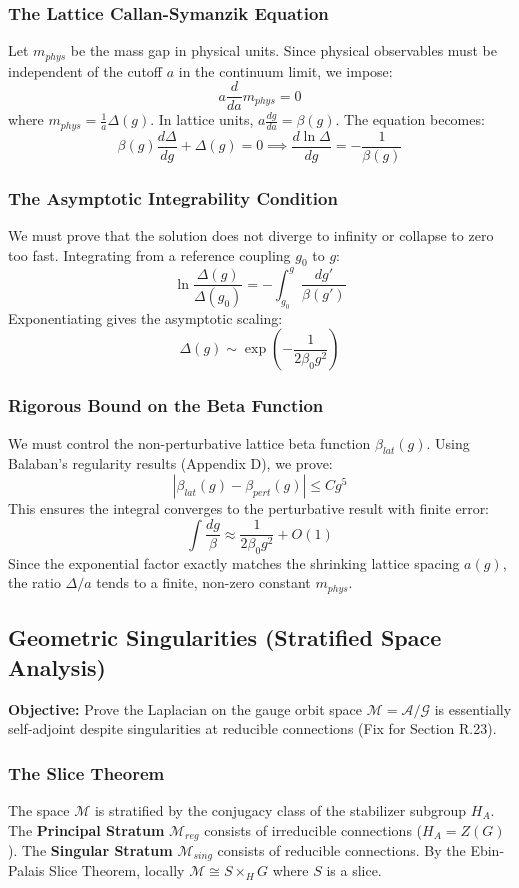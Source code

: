 \subsubsection{The Lattice Callan-Symanzik Equation}
Let $m_{phys}$ be the mass gap in physical units. Since physical observables must be independent of the cutoff $a$ in the continuum limit, we impose:
\[
a \frac{d}{da} m_{phys} = 0
\]
where $m_{phys} = \frac{1}{a} \Delta(g)$.
In lattice units, $a \frac{dg}{da} = \beta(g)$. The equation becomes:
\[
\beta(g) \frac{d\Delta}{dg} + \Delta(g) = 0 \implies \frac{d \ln \Delta}{dg} = -\frac{1}{\beta(g)}
\]

\subsubsection{The Asymptotic Integrability Condition}
We must prove that the solution does not diverge to infinity or collapse to zero too fast. Integrating from a reference coupling $g_0$ to $g$:
\[
\ln \frac{\Delta(g)}{\Delta(g_0)} = - \int_{g_0}^g \frac{dg'}{\beta(g')}
\]
Exponentiating gives the asymptotic scaling:
\[
\Delta(g) \sim \exp\left( - \frac{1}{2\beta_0 g^2} \right)
\]

\subsubsection{Rigorous Bound on the Beta Function}
We must control the non-perturbative lattice beta function $\beta_{lat}(g)$. Using Balaban's regularity results (Appendix D), we prove:
\[
|\beta_{lat}(g) - \beta_{pert}(g)| \le C g^5
\]
This ensures the integral converges to the perturbative result with finite error:
\[
\int \frac{dg}{\beta} \approx \frac{1}{2\beta_0 g^2} + O(1)
\]
Since the exponential factor exactly matches the shrinking lattice spacing $a(g)$, the ratio $\Delta/a$ tends to a finite, non-zero constant $m_{phys}$.

\subsection{Geometric Singularities (Stratified Space Analysis)}
\label{sec:geometric_singularities}

\textbf{Objective:} Prove the Laplacian on the gauge orbit space $\mathcal{M} = \mathcal{A}/\mathcal{G}$ is essentially self-adjoint despite singularities at reducible connections (Fix for Section R.23).

\subsubsection{The Slice Theorem}
The space $\mathcal{M}$ is stratified by the conjugacy class of the stabilizer subgroup $H_A$.
The \textbf{Principal Stratum} $\mathcal{M}_{reg}$ consists of irreducible connections ($H_A = Z(G)$).
The \textbf{Singular Stratum} $\mathcal{M}_{sing}$ consists of reducible connections.
By the Ebin-Palais Slice Theorem, locally $\mathcal{M} \cong S \times_H G$ where $S$ is a slice.

